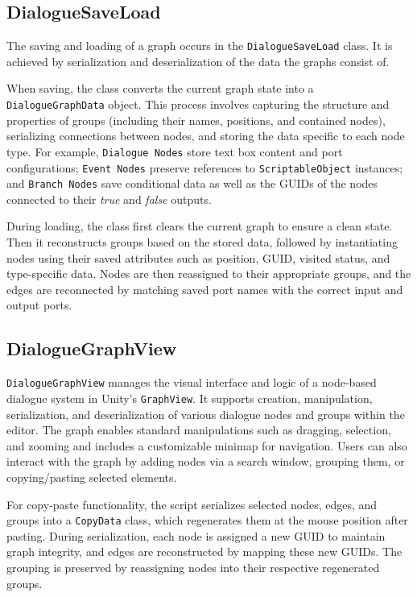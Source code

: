 \subsection{DialogueSaveLoad}
The saving and loading of a graph occurs in the \verb|DialogueSaveLoad| class. It is achieved by serialization and deserialization of the data the graphs consist of. 

When saving, the class converts the current graph state into a \verb|DialogueGraphData| object. This process involves capturing the structure and properties of groups (including their names, positions, and contained nodes), serializing connections between nodes, and storing the data specific to each node type. For example, \verb|Dialogue Nodes| store text box content and port configurations; \verb|Event Nodes| preserve references to \verb|ScriptableObject| instances; and \verb|Branch Nodes| save conditional data as well as the GUIDs of the nodes connected to their \textit{true} and \textit{false} outputs.

During loading, the class first clears the current graph to ensure a clean state. Then it reconstructs groups based on the stored data, followed by instantiating nodes using their saved attributes such as position, GUID, visited status, and type-specific data. Nodes are then reassigned to their appropriate groups, and the edges are reconnected by matching saved port names with the correct input and output ports.


\subsection{DialogueGraphView}
\verb|DialogueGraphView| manages the visual interface and logic of a node-based dialogue system in Unity's \verb|GraphView|. It supports creation, manipulation, serialization, and deserialization of various dialogue nodes and groups within the editor. The graph enables standard manipulations such as dragging, selection, and zooming and includes a customizable minimap for navigation. Users can also interact with the graph by adding nodes via a search window, grouping them, or copying/pasting selected elements. 

For copy-paste functionality, the script serializes selected nodes, edges, and groups into a \verb|CopyData| class, which regenerates them at the mouse position after pasting. During serialization, each node is assigned a new GUID to maintain graph integrity, and edges are reconstructed by mapping these new GUIDs. The grouping is preserved by reassigning nodes into their respective regenerated groups.

